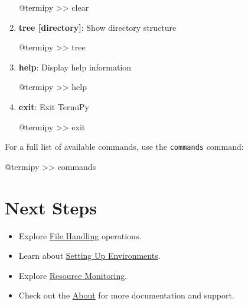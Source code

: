 \documentclass[
  letterpaper,
  DIV=11,
  numbers=noendperiod]{scrreprt}
\newenvironment{Shaded}{\begin{snugshade}}{\end{snugshade}}
\newcommand{\ExtensionTok}[1]{\textcolor[rgb]{0.00,0.23,0.31}{#1}}
\newcommand{\NormalTok}[1]{\textcolor[rgb]{0.00,0.23,0.31}{#1}}
\newcommand{\OperatorTok}[1]{\textcolor[rgb]{0.37,0.37,0.37}{#1}}
\providecommand{\tightlist}{%
  \setlength{\itemsep}{0pt}\setlength{\parskip}{0pt}}\usepackage{longtable,booktabs,array}
\begin{document}
\begin{enumerate}
\begin{Shaded}
\begin{Highlighting}[]
\ExtensionTok{@termipy} \OperatorTok{\textgreater{}\textgreater{}}\NormalTok{ clear}
\end{Highlighting}
\end{Shaded}
\item
  \textbf{tree {[}directory{]}}: Show directory structure

\begin{Shaded}
\begin{Highlighting}[]
\ExtensionTok{@termipy} \OperatorTok{\textgreater{}\textgreater{}}\NormalTok{ tree}
\end{Highlighting}
\end{Shaded}
\item
  \textbf{help}: Display help information

\begin{Shaded}
\begin{Highlighting}[]
\ExtensionTok{@termipy} \OperatorTok{\textgreater{}\textgreater{}}\NormalTok{ help}
\end{Highlighting}
\end{Shaded}
\item
  \textbf{exit}: Exit TermiPy

\begin{Shaded}
\begin{Highlighting}[]
\ExtensionTok{@termipy} \OperatorTok{\textgreater{}\textgreater{}}\NormalTok{ exit}
\end{Highlighting}
\end{Shaded}
\end{enumerate}

For a full list of available commands, use the \texttt{commands}
command:

\begin{Shaded}
\begin{Highlighting}[]
\ExtensionTok{@termipy} \OperatorTok{\textgreater{}\textgreater{}}\NormalTok{ commands}
\end{Highlighting}
\end{Shaded}

\section*{Next Steps}\label{next-steps}


\begin{itemize}
\tightlist
\item
  Explore \href{file-handling.qmd}{File Handling} operations.
\item
  Learn about \href{setting-environment.qmd}{Setting Up Environments}.
\item
  Explore \href{resource-stats.qmd}{Resource Monitoring}.
\item
  Check out the \href{about.qmd}{About} for more documentation and
  support.
\end{itemize}
\end{document}
